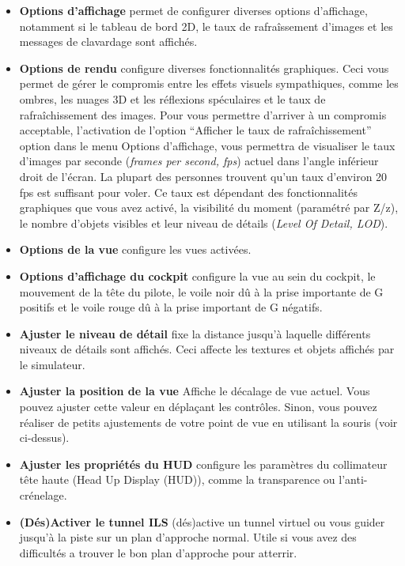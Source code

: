 \begin{itemize}
{ \begin{itemize}
  \item \textbf{Options d'affichage} permet de configurer diverses options d'affichage, notamment si le tableau de bord 2D, le taux de rafra\^{i}ssement d'images et les messages de clavardage sont affich\'{e}s.
  \item \textbf{Options de rendu} configure diverses fonctionnalit\'{e}s graphiques. Ceci vous permet de g\'{e}rer le compromis entre les effets visuels sympathiques, comme les ombres, les nuages 3D et les r\'{e}flexions sp\'{e}culaires et le taux de rafra\^{i}chissement des images. Pour vous permettre d'arriver \`{a} un compromis acceptable, l'activation de l'option ``Afficher le taux de rafra\^{i}chissement'' option dans le menu Options d'affichage, vous permettra de visualiser le taux d'images par seconde (\textit{frames per second, fps}) actuel dans l'angle inf\'{e}rieur droit de l'\'{e}cran. La plupart des personnes trouvent qu'un taux d'environ 20 fps est suffisant pour voler. Ce taux est d\'{e}pendant des fonctionnalit\'{e}s graphiques que vous avez activ\'{e}, la visibilit\'{e} du moment (param\'{e}tr\'{e} par Z/z), le nombre d'objets visibles et leur niveau de d\'{e}tails (\textit{Level Of Detail, LOD}).
  \item \textbf{Options de la vue} configure les vues activ\'{e}es.
  \item \textbf{Options d'affichage du cockpit} configure la vue au sein du cockpit, le mouvement de la t\^{e}te du pilote, le voile noir d\^{u} \`{a} la prise importante de G positifs et le voile rouge d\^{u} \`{a} la prise important de G n\'{e}gatifs.
  \item \textbf{Ajuster le niveau de d\'{e}tail} fixe la distance jusqu'\`{a} laquelle diff\'{e}rents niveaux de d\'{e}tails sont affich\'{e}s. Ceci affecte les textures et objets affich\'{e}s par le simulateur.
  \item \textbf{Ajuster la position de la vue} Affiche le d\'{e}calage de vue actuel. Vous pouvez ajuster cette valeur en d\'{e}pla\c{c}ant les contr\^{o}les. Sinon, vous pouvez r\'{e}aliser de petits ajustements de votre point de vue en utilisant la souris (voir ci-dessus).
  \item \textbf{Ajuster les propri\'{e}t\'{e}s du HUD} configure les param\`{e}tres du collimateur t\^{e}te haute (Head Up Display (HUD)), comme la transparence ou l'anti-cr\'{e}nelage.
  \item \textbf{(D\'{e}s)Activer le tunnel ILS} (d\'{e}s)active un tunnel virtuel ou vous guider jusqu'\`{a} la piste sur un plan d'approche normal. Utile si vous avez des difficult\'{e}s a trouver le bon plan d'approche pour atterrir.

\end{itemize}}
\end{itemize}
